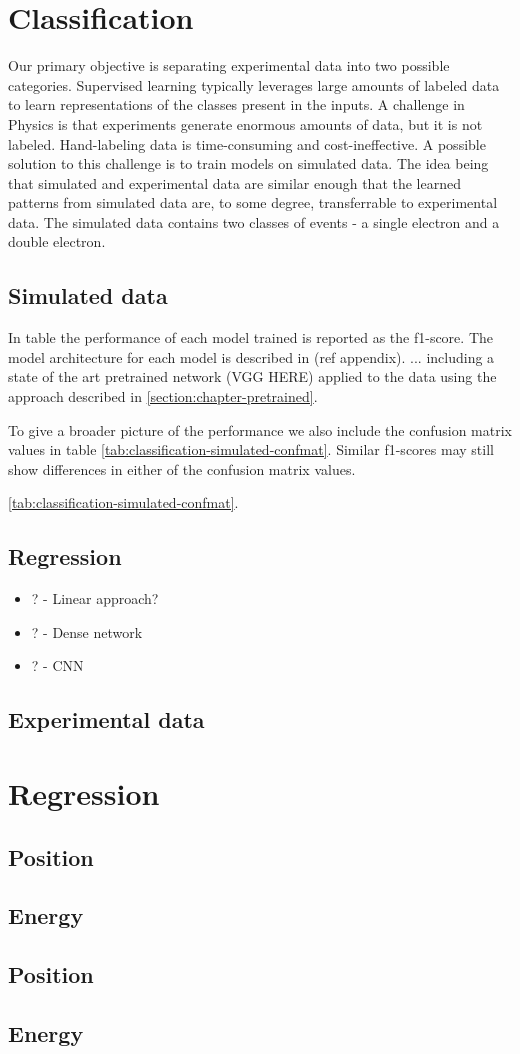 \section{Classification}
Our primary objective is separating experimental data into two possible categories.
Supervised learning typically leverages large amounts of labeled data to learn
representations of the classes present in the inputs. A challenge in Physics is that
experiments generate enormous amounts of data, but it is not labeled. Hand-labeling
data is time-consuming and cost-ineffective. A possible solution to this challenge
is to train models on simulated data. The idea being that simulated and experimental
data are similar enough that the learned patterns from simulated data are, to some degree,
transferrable to experimental data.
The simulated data contains two classes of events - a single electron and a double electron.
\subsection{Simulated data}
In table  the performance of each model trained is reported
as the f1-score. The model architecture for each model is described in (ref appendix).
... including a state of the art pretrained network (\cite{}VGG HERE) applied to the data using
the approach described in \ref{section:chapter-pretrained}.

To give a broader picture of the performance we also include the confusion matrix values in
table \ref{tab:classification-simulated-confmat}. Similar f1-scores may still show differences
in either of the confusion matrix values.

\ref{tab:classification-simulated-confmat}.

\subsection{Regression}

\begin{itemize}
  \item ? - Linear approach?
  \item ? - Dense network
  \item ? - CNN
\end{itemize}
\subsection{Experimental data}
\section{Regression}
\subsection{Position}
\subsection{Energy}
\subsection{Position}
\subsection{Energy}

